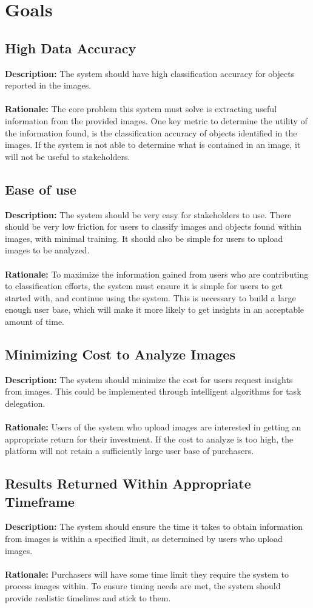 \documentclass{article}
\begin{document}
\section{Goals}
\subsection{High Data Accuracy}
\textbf{Description: }The system should have high classification accuracy for objects reported in the images. \\\\
\textbf{Rationale: }The core problem this system must solve is extracting useful information from the provided images.
 One key metric to determine the utility of the information found, is the classification accuracy of objects identified in the images. If the system is 
 not able to determine what is contained in an image, it will not be useful to stakeholders.
\subsection{Ease of use}
\textbf{Description: }The system should be very easy for stakeholders to use. There should be very low friction for users to classify images and objects found
within images, with minimal training. It should also be simple for users to upload images to be analyzed.\\\\
\textbf{Rationale: }To maximize the information gained from users who are contributing to classification efforts, the system must ensure it is simple for users to 
get started with, and continue using the system. This is necessary to build a large enough user base, which will make it more likely to get insights in an acceptable 
amount of time.
\subsection{Minimizing Cost to Analyze Images}
\textbf{Description: }The system should minimize the cost for users request insights from images. This could be implemented through intelligent algorithms for task delegation. \\\\
\textbf{Rationale: }Users of the system who upload images are interested in getting an appropriate return for their investment. If the cost to analyze is too high, the platform will not
retain a sufficiently large user base of purchasers.
\subsection{Results Returned Within Appropriate Timeframe}
\textbf{Description: }The system should ensure the time it takes to obtain information from images is within a specified limit, as determined by users who upload images. \\\\
\textbf{Rationale: }Purchasers will have some time limit they require the system to process images within. To ensure timing needs are met, the system should provide realistic timelines and stick to them.
\end{document}
